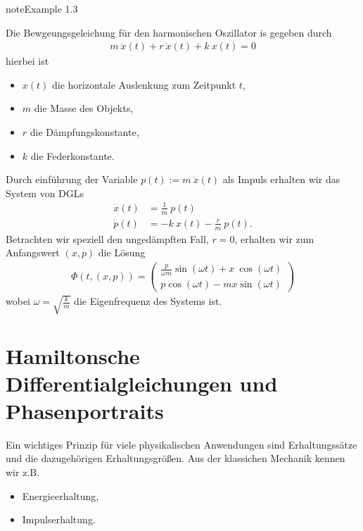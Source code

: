 \documentclass[letterpaper,10pt,english]{jupyterBook}
\begin{document}
\begin{sphinxadmonition}{note}{Example 1.3}



Die Bewgeungsgeleichung für den harmonischen Oszillator is gegeben durch
\begin{equation*}
\begin{split}m~\ddot{x}(t) + r~\dot{x}(t) + k~x(t)=0\end{split}
\end{equation*}
hierbei ist
\begin{itemize}
\item {} 
\(x(t)\) die horizontale Auslenkung zum Zeitpunkt \(t\),

\item {} 
\(m\) die Masse des Objekts,

\item {} 
\(r\) die Dämpfungskonstante,

\item {} 
\(k\) die Federkonstante.

\end{itemize}

Durch einführung der Variable \(p(t):= m~\dot{x}(t)\) als Impuls erhalten wir das System von DGLs
\begin{equation*}
\begin{split}\dot{x}(t) &= \frac{1}{m}~p(t) \\
\dot{p}(t) &= -k~x(t) - \frac{r}{m}~p(t).\end{split}
\end{equation*}
Betrachten wir speziell den ungedämpften Fall, \(r=0\), erhalten wir zum Anfangswert \((x,p)\) die Lösung
\begin{equation*}
\begin{split}\Phi(t, (x,p)) = 
\begin{pmatrix}
\frac{p}{\omega m}\sin(\omega t) + x~\cos(\omega t)\\
p \cos(\omega t) - m x \sin(\omega t)
\end{pmatrix}\end{split}
\end{equation*}
wobei \(\omega=\sqrt{\frac{k}{m}}\) die Eigenfrequenz des Systems ist.
\end{sphinxadmonition}

\noindent{}


\section{Hamiltonsche Differentialgleichungen und Phasenportraits}
\label{\detokenize{ode/hamilton:hamiltonsche-differentialgleichungen-und-phasenportraits}}\label{\detokenize{ode/hamilton::doc}}
Ein wichtiges Prinzip für viele physikalischen Anwendungen sind Erhaltungssätze und die dazugehörigen Erhaltungsgrößen. Aus der klassichen Mechanik kennen wir z.B.
\begin{itemize}
\item {} 
Energieerhaltung,

\item {} 
Impulserhaltung.

\end{itemize}
\end{document}
